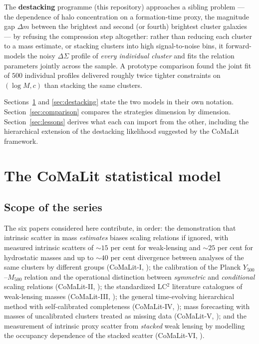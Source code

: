 \documentclass[11pt,a4paper]{article}
\newcommand{\DSigma}{\Delta\Sigma}
\begin{document}
The \textbf{destacking} programme (this repository) approaches a sibling
problem --- the dependence of halo concentration on a formation-time proxy,
the magnitude gap $\Delta m$ between the brightest and second (or fourth)
brightest cluster galaxies --- by refusing the compression step altogether:
rather than reducing each cluster to a mass estimate, or stacking clusters
into high signal-to-noise bins, it forward-models the noisy $\DSigma$
profile of \emph{every individual cluster} and fits the relation parameters
jointly across the sample. A prototype comparison found the joint fit of
$500$ individual profiles delivered roughly twice tighter constraints on
$(\log M, c)$ than stacking the same clusters.

Sections~\ref{sec:comalit} and \ref{sec:destacking} state the two models in
their own notation. Section~\ref{sec:comparison} compares the strategies
dimension by dimension. Section~\ref{sec:lessons} derives what each can
import from the other, including the hierarchical extension of the
destacking likelihood suggested by the CoMaLit framework.

\section{The CoMaLit statistical model}
\label{sec:comalit}

\subsection{Scope of the series}

The six papers considered here contribute, in order: the demonstration that
intrinsic scatter in mass \emph{estimates} biases scaling relations if
ignored, with measured intrinsic scatters of ${\sim}15$ per cent for
weak-lensing and ${\sim}25$ per cent for hydrostatic masses and up to
${\sim}40$ per cent divergence between analyses of the same clusters by
different groups (CoMaLit-I, \cite{comalit1}); the calibration of the
Planck $Y_{500}$--$M_{500}$ relation and the operational distinction between
\emph{symmetric} and \emph{conditional} scaling relations (CoMaLit-II,
\cite{comalit2}); the standardized LC$^2$ literature catalogues of
weak-lensing masses (CoMaLit-III, \cite{comalit3}); the general
time-evolving hierarchical method with self-calibrated completeness
(CoMaLit-IV, \cite{comalit4}); mass forecasting with masses of uncalibrated
clusters treated as missing data (CoMaLit-V, \cite{comalit5}); and the
measurement of intrinsic proxy scatter from \emph{stacked} weak lensing by
modelling the occupancy dependence of the stacked scatter (CoMaLit-VI,
\cite{comalit6}).
\end{document}
